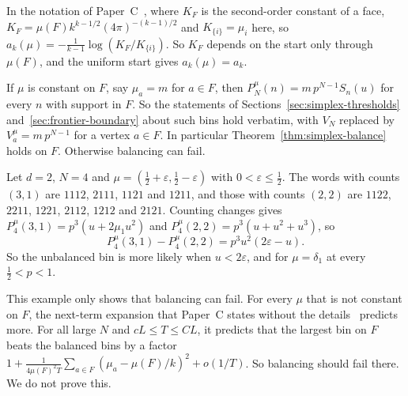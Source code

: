 In the notation of Paper~C~\cite{paperC}, where $K_F$ is the second-order
constant of a face, $K_F=\mu(F)k^{k-1/2}(4\pi)^{-(k-1)/2}$ and
$K_{\{i\}}=\mu_i$ here, so $a_k(\mu)=-\frac1{k-1}\log(K_F/K_{\{i\}})$. So $K_F$
depends on the start only through $\mu(F)$, and the uniform start gives
$a_k(\mu)=a_k$.

If $\mu$ is constant on $F$, say $\mu_a=m$ for $a\in F$, then
$P^\mu_N(n)=m\,p^{N-1}S_n(u)$ for every $n$ with support in $F$. So the
statements of Sections~\ref{sec:simplex-thresholds}
and~\ref{sec:frontier-boundary} about such bins hold verbatim, with $V_N$
replaced by $V^\mu_a=m\,p^{N-1}$ for a vertex $a\in F$. In particular
Theorem~\ref{thm:simplex-balance} holds on $F$. Otherwise balancing can fail.

\begin{example}\label{ex:start-balance}
Let $d=2$, $N=4$ and $\mu=(\frac12+\varepsilon,\frac12-\varepsilon)$ with
$0<\varepsilon\le\frac12$. The words with counts $(3,1)$ are $1112$, $2111$,
$1121$ and $1211$, and those with counts $(2,2)$ are $1122$, $2211$, $1221$,
$2112$, $1212$ and $2121$. Counting changes gives
$P^\mu_4(3,1)=p^3(u+2\mu_1u^2)$ and $P^\mu_4(2,2)=p^3(u+u^2+u^3)$, so
\[
 P^\mu_4(3,1)-P^\mu_4(2,2)=p^3u^2(2\varepsilon-u).
\]
So the unbalanced bin is more likely when $u<2\varepsilon$, and for
$\mu=\delta_1$ at every $\frac12<p<1$.
\end{example}

This example only shows that balancing can fail. For every $\mu$ that is not
constant on $F$, the next-term expansion that Paper~C states without the
details~\cite{paperC} predicts more. For all large $N$ and $cL\le T\le CL$, it
predicts that the largest bin on $F$ beats the balanced bins by a factor
$1+\frac1{4\mu(F)^2T}\sum_{a\in F}(\mu_a-\mu(F)/k)^2+o(1/T)$. So balancing should
fail there. We do not prove this.

